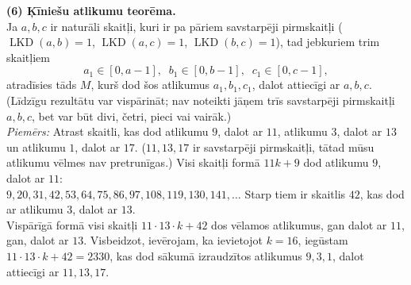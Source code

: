 \documentclass[a4paper,12pt]{article}
\begin{document}
{\bf (6) Ķīniešu atlikumu teorēma.}\\
Ja $a,b,c$ ir naturāli skaitļi, kuri ir pa pāriem savstarpēji pirmskaitļi ($\operatorname{LKD}(a,b)=1$, 
$\operatorname{LKD}(a,c)=1$, $\operatorname{LKD}(b,c)=1$), tad jebkuriem trim skaitļiem 
$$a_1 \in [0,a-1],\;\;b_1 \in [0,b-1],\;\;c_1 \in [0,c-1],$$
atradīsies tāds $M$, kurš dod šos atlikumus $a_1,b_1,c_1$, dalot attiecīgi ar $a,b,c$. 
(Līdzīgu rezultātu var vispārināt; nav noteikti jāņem trīs savstarpēji pirmskaitļi $a,b,c$, 
bet var būt divi, četri, pieci vai vairāk.)\\
{\em Piemērs:} Atrast skaitli, kas dod atlikumu $9$, dalot ar $11$, atlikumu $3$, dalot ar $13$ un 
atlikumu $1$, dalot ar $17$. ($11,13,17$ ir savstarpēji pirmskaitļi, tātad mūsu atlikumu vēlmes nav pretrunīgas.)
Visi skaitļi formā $11k+9$ dod atlikumu $9$, dalot ar $11$:\\
$9,20,31,42,53,64,75,86,97,108,119,130,141,\ldots$
Starp tiem ir skaitlis $42$, kas dod ar atlikumu $3$, dalot ar $13$.\\
Vispārīgā formā visi skaitļi $11 \cdot 13 \cdot k + 42$ dos vēlamos atlikumus, 
gan dalot ar $11$, gan, dalot ar $13$. 
Visbeidzot, ievērojam, ka ievietojot $k=16$, iegūstam 
$11 \cdot 13 \cdot k + 42 = 2330$, kas dod 
sākumā izraudzītos atlikumus $9,3,1$, dalot attiecīgi ar $11,13,17$. 
\end{document}
